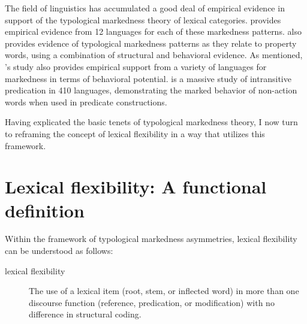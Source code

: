 The field of linguistics has accumulated a good deal of empirical evidence in support of the typological markedness theory of lexical categories. \textcite{Croft1991} provides empirical evidence from 12 languages for each of these markedness patterns. \textcite{Dixon1977} also provides evidence of typological markedness patterns as they relate to property words, using a combination of structural and behavioral evidence. As mentioned, \citeauthor{HopperThompson1984}'s \parencite*{HopperThompson1984} study also provides empirical support from a variety of languages for markedness in terms of behavioral potential. \textcite{Stassen1997} is a massive study of intransitive predication in 410 languages, demonstrating the marked behavior of non-action words when used in predicate constructions.

Having explicated the basic tenets of typological markedness theory, I now turn to reframing the concept of lexical flexibility in a way that utilizes this framework.

\section{Lexical flexibility: A functional definition}
\label{sec:2.5}

Within the framework of typological markedness asymmetries, lexical flexibility can be understood as follows:

\begin{description}
  \item[lexical flexibility] The use of a lexical item (root, stem, or inflected word) in more than one discourse function (reference, predication, or modification) with no difference in structural coding.
\end{description}

